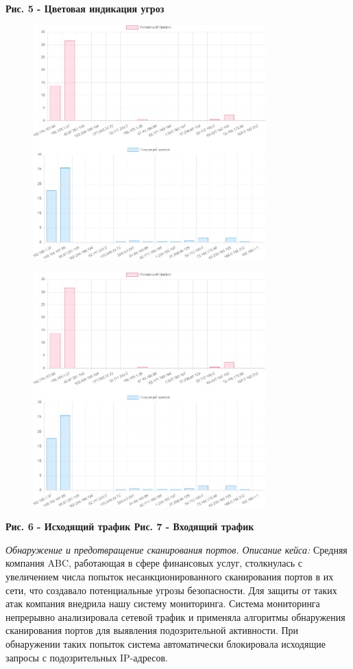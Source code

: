 \textbf{Рис. 5 - Цветовая индикация угроз}

\begin{figure}[H]
	\centering
	\includegraphics[width=0.8\textwidth]{assets/52}
	\caption*{}
\end{figure}\begin{figure}[H]
	\centering
	\includegraphics[width=0.8\textwidth]{assets/52}
	\caption*{}
\end{figure}

\textbf{Рис. 6 - Исходящий трафик Рис. 7 - Входящий трафик}

\emph{Обнаружение и предотвращение сканирования портов. Описание кейса:}
Средняя компания ABC, работающая в сфере финансовых услуг, столкнулась с
увеличением числа попыток несанкционированного сканирования портов в их
сети, что создавало потенциальные угрозы безопасности. Для защиты от
таких атак компания внедрила нашу систему мониторинга. Система
мониторинга непрерывно анализировала сетевой трафик и применяла
алгоритмы обнаружения сканирования портов для выявления подозрительной
активности. При обнаружении таких попыток система автоматически
блокировала исходящие запросы с подозрительных IP-адресов.

